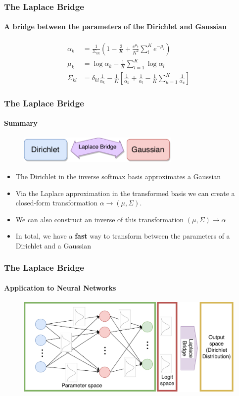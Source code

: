 \documentclass[10pt,usepdftitle=false,aspectratio=169,handout]{beamer}
\begin{document}

\begin{frame}\frametitle{The Laplace Bridge}
	\framesubtitle{A bridge between the parameters of the Dirichlet and Gaussian}
	\begin{align}
	\alpha_k &= \frac{1}{\Sigma_{kk}}\left(1 - \frac{2}{K} + \frac{e^{\mu_k}}{K^2}\sum_l^K e^{-\mu_l} \right)
	\label{eq:alpha_transform}
	\\
	\mu_k &= \log \alpha_k  - \frac{1}{K} \sum_{l=1}^{K} \log \alpha_l
	\\
	\Sigma_{kl} &= \delta_{kl} \frac{1}{\alpha_k} - \frac{1}{K} \left[\frac{1}{\alpha_k} + \frac{1}{\alpha_l} - \frac{1}{K} \sum_{u=1}^{K} \frac{1}{\alpha_u}\right]
	\end{align}
\end{frame}


\begin{frame}\frametitle{The Laplace Bridge}
	\framesubtitle{Summary}
	\begin{figure}
		\includegraphics[width=0.7\textwidth]{../figures/Laplace_Bridge_sketch.pdf}
	\end{figure}
	\begin{itemize}
		\item The Dirichlet in the inverse softmax basis approximates a Gaussian
		\item Via the Laplace approximation in the transformed basis we can create a closed-form transformation $\alpha \rightarrow (\mu, \Sigma)$.
		\item We can also construct an inverse of this transformation $(\mu, \Sigma) \rightarrow \alpha$
		\item In total, we have a \textbf{fast} way to transform between the parameters of a Dirichlet and a Gaussian
	\end{itemize}
\end{frame}


\begin{frame}\frametitle{The Laplace Bridge}
	\framesubtitle{Application to Neural Networks}
	\begin{figure}
		\includegraphics[width=\textwidth]{../figures/GaussNN_LaplaceBridge.pdf}
	\end{figure}
\end{frame}
\end{document}
